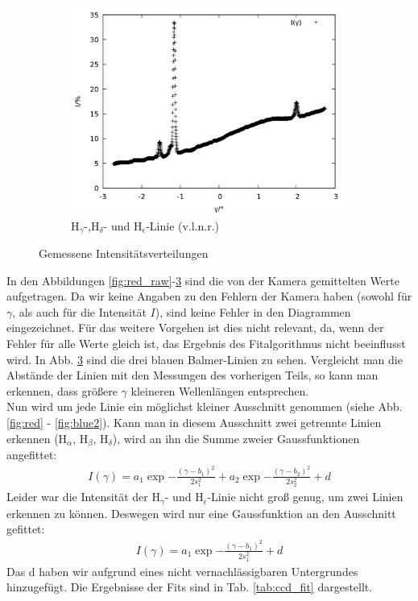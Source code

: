 \begin{figure}[h]
\begin{subfigure}[c]{0.49\linewidth}
  	\label{fig:lightblue_raw}
  \end{subfigure}
  \begin{subfigure}[c]{0.49\linewidth}
  	\includegraphics[width=1\linewidth]{data/Balmer/out_blue_raw.png}
  	\caption{H$_\gamma$-,H$_\delta$- und H$_\epsilon$-Linie (v.l.n.r.)}
  	\label{fig:blue_raw}
  \end{subfigure}
  \caption{Gemessene Intensitätsverteilungen}
\end{figure}

In den Abbildungen \ref{fig:red_raw}-\ref{fig:blue_raw} sind die von der Kamera gemittelten Werte aufgetragen. Da wir keine Angaben zu den Fehlern der Kamera haben (sowohl für $\gamma$, als auch für die Intensität $I$), sind keine Fehler in den Diagrammen eingezeichnet. Für das weitere Vorgehen ist dies nicht relevant, da, wenn der Fehler für alle Werte gleich ist, das Ergebnis des Fitalgorithmus nicht beeinflusst wird. In Abb. \ref{fig:blue_raw} sind die drei blauen Balmer-Linien zu sehen. Vergleicht man die Abstände der Linien mit den Messungen des vorherigen Teils, so kann man erkennen, dass größere $\gamma$ kleineren Wellenlängen entsprechen.\\

Nun wird um jede Linie ein möglichst kleiner Ausschnitt genommen (siehe Abb. \ref{fig:red} - \ref{fig:blue2}). Kann man in diesem Ausschnitt zwei getrennte Linien erkennen (H$_\alpha$, H$_\beta$, H$_\delta$), wird an ihn die Summe zweier Gaussfunktionen angefittet:
\begin{align*}
I(\gamma) = a_1\exp{-\frac{(\gamma-b_1)^2}{2s_1^2}} + a_2\exp{-\frac{(\gamma-b_2)^2}{2s_2^2}} + d
\end{align*}
Leider war die Intensität der H$_\gamma$- und H$_\epsilon$-Linie nicht groß genug, um zwei Linien erkennen zu können. Deswegen wird nur eine Gaussfunktion an den Ausschnitt gefittet:
\begin{align*}
I(\gamma) = a_1\exp{-\frac{(\gamma-b_1)^2}{2s_1^2}} + d
\end{align*}
Das d haben wir aufgrund eines nicht vernachlässigbaren Untergrundes hinzugefügt. Die Ergebnisse der Fits sind in Tab. \ref{tab:ccd_fit} dargestellt.

